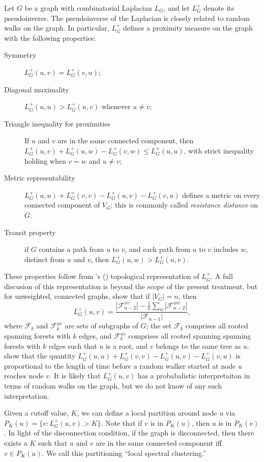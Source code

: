 \documentclass{article}
\begin{document}
Let $G$ be a graph with combinatorial Laplacian $L_G$, and let
$L_G^+$ denote its pseudoinverse. The pseudoinverse of the Laplacian is closely
related to random walks on the graph.  In particular, 
$L_{G}^{+}$ defines a proximity measure on the graph with the
following properties:
\begin{description}
  \item[Symmetry]
    $L_G^{+}(u,v) = L_G^{+}(v,u)$;
 \item[Diagonal maximality]
    $L_G^{+}(u,u) > L_G^{+} (u,v)$ whenever $u \neq v$;
  \item[Triangle inequality for proximities]
    If $u$ and $v$ are in the same connected component, then
    $L_G^{+} (u,v) + L_G^{+} (u,w) - L_G^{+} (v,w) \leq L_G^{+} (u,u)$, with strict inequality
    holding when $v = w$ and $u \neq v$;
  \item[Metric representability]
   $L_G^{+} (u,u) + L_G^{+} (v,v) - L_G^{+} (u,v) - L_G^{+} (v,u)$
    defines a metric on every connected component of $V_G$;  this is commonly called
    \emph{resistance distance} on $G$.
 \item[Transit property]
    if $G$ contains a path from $u$ to $v$, and each path from $u$ to
    $v$ includes $w$, distinct from $u$ and $v$, then $L_G^{+}(u,w) >
    L_G^{+}(u,v)$.
\end{description}
These properties follow from 's
(\citeyear{chebotarev1998proximity}) topological representation of
$L_G^{+}$.  A full discusion of this representation is beyond the
scope of the present treatment, but for unweighted, connected graphs,
 show that if $|V_G| = n$,
then
\[
  L_G^{+}(u,v) = \frac{|\mathcal{F}_{n-2}^{uv}| - \frac{1}{n}
    \sum_{w} |\mathcal{F}_{n-2}^{uw}|}{|\mathcal{F}_{n-1}|},
\]
where $\mathcal{F}_k$ and $\mathcal{F}_k^{uv}$ are sets of subgraphs
of $G$; the set $\mathcal{F}_{k}$ comprises all rooted spanning forests
with $k$ edges, and $\mathcal{F}_{k}^{uv}$ comprises all rooted spanning
spanning forests with $k$ edges such that $u$ is a root, and $v$
belongs to the same tree as $u$.  \cite{chandra1989electrical} show that the
quantity
$L_G^{+} (u,u) + L_G^{+} (v,v) - L_G^{+} (u,v) - L_G^{+} (v,u)$ is
proportional to the length of time before a random walker started at
node $u$ reaches node $v$.  It is likely that $L_G^{+}(u,v)$ has a
probabalistic interpretaiton in terms of random walks on the graph,
but we do not know of any such interpretation.

Given a cutoff value, $K$, we can define a local partition around node
$u$ via $P_K(u) = \{ v : L_G^{+}(u,v) > K \}$.  Note that if $v$ is in
$P_K(u)$, then $u$ is in $P_K(v)$.  In light of the disconnection
condition, if the graph is disconnected, then there exists a $K$ such
that $u$ and $v$ are in the same connected component iff
$v \in P_K(u)$.  We call this partitioning ``local spectral
clustering.''
\end{document}
